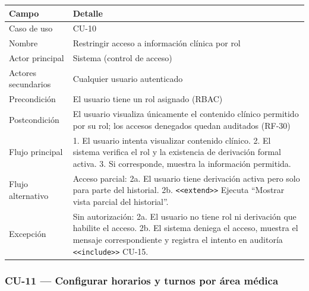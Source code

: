 \documentclass[11pt,a4paper]{article}
\begin{document}
	\begin{longtable}{p{} p{} }
		
		
		\toprule
		\textbf{Campo} &
		\textbf{Detalle}  \\
		\midrule
		\endhead
		
		Caso de uso & CU-10 \\
		Nombre & Restringir acceso a información clínica por rol \\
		Actor principal & Sistema (control de acceso) \\
		Actores secundarios & Cualquier usuario autenticado \\
		Precondición & El usuario tiene un rol asignado (RBAC) \\
		Postcondición & El usuario visualiza únicamente el contenido clínico permitido por su rol; los accesos denegados quedan auditados (RF-30) \\
		Flujo principal & 1. El usuario intenta visualizar contenido clínico. 2. El sistema verifica el rol y la existencia de derivación formal activa. 3. Si corresponde, muestra la información permitida. \\
		Flujo alternativo & Acceso parcial: 2a. El usuario tiene derivación activa pero solo para parte del historial. 2b. \texttt{<<extend>>} Ejecuta ``Mostrar vista parcial del historial''. \\
		Excepción & Sin autorización: 2a. El usuario no tiene rol ni derivación que habilite el acceso. 2b. El sistema deniega el acceso, muestra el mensaje correspondiente y registra el intento en auditoría \texttt{<<include>>} CU-15. \\
		\bottomrule
	\end{longtable}
	
	\subsubsection{CU-11 --- Configurar horarios y turnos por área médica}
	
\end{document}
